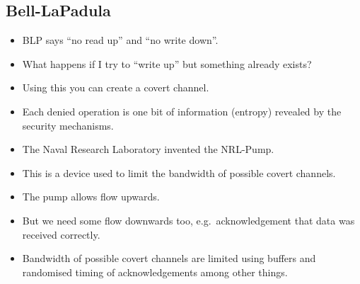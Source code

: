 \documentclass{beamer}
\begin{document}
\subsection{Bell-LaPadula}

\begin{frame}{\insertsubsectionhead}
  \begin{itemize}
    \item BLP says ``no read up'' and ``no write down''.

    \item What happens if I try to ``write up'' but something already exists?

    \item Using this you can create a covert channel.

    \item Each denied operation is one bit of information (entropy) revealed by 
      the security mechanisms.

  \end{itemize}
\end{frame}

\begin{frame}{\insertsubsectionhead}
  \begin{itemize}
    \item The Naval Research Laboratory invented the NRL-Pump.

    \item This is a device used to limit the bandwidth of possible covert 
      channels.

    \item The pump allows flow upwards.

    \item But we need some flow downwards too, e.g.\ acknowledgement that data 
      was received correctly.

    \item Bandwidth of possible covert channels are limited using buffers and 
      randomised timing of acknowledgements among other things.
  \end{itemize}
\end{frame}
\end{document}
